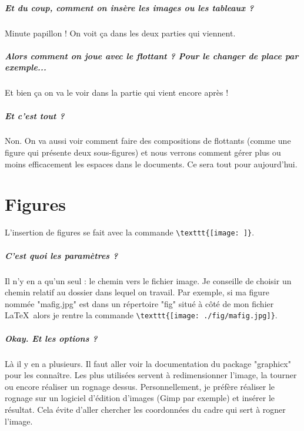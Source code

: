 \documentclass[a4paper, 13pt]{report} %
\begin{document}
		\paragraph{Et du coup, comment on insère les images ou les tableaux ?\\}
			Minute papillon ! On voit ça dans les deux parties qui viennent.
		
		\paragraph{Alors comment on joue avec le flottant ? Pour le changer de place par exemple...\\}
			Et bien ça on va le voir dans la partie qui vient encore après !
		
		\paragraph{Et c'est tout ?\\}
			Non. On va aussi voir comment faire des compositions de flottants (comme une figure qui présente deux sous-figures) et nous verrons comment gérer plus ou moins efficacement les espaces dans le documents. Ce sera tout pour aujourd'hui.
	
	\chapter{Figures}
		L'insertion de figures se fait avec la commande \verb|\texttt{[image: ]}|.
		\paragraph{C'est quoi les paramètres ?\\}
			Il n'y en a qu'un seul : le chemin vers le fichier image. Je conseille de choisir un chemin relatif au dossier dans lequel on travail. Par exemple, si ma figure nommée "mafig.jpg" est dans un répertoire "fig" situé à côté de mon fichier \LaTeX\  alors je rentre la commande \verb|\texttt{[image: ./fig/mafig.jpg]}|.
		\paragraph{Okay. Et les options ?\\}
			Là il y en a plusieurs. Il faut aller voir la documentation du package "graphicx" pour les connaître. Les plus utilisées servent à redimensionner l'image, la tourner ou encore réaliser un rognage dessus. Personnellement, je préfère réaliser le rognage sur un logiciel d'édition d'images (Gimp par exemple) et insérer le résultat. Cela évite d'aller chercher les coordonnées du cadre qui sert à rogner l'image.
\end{document}
